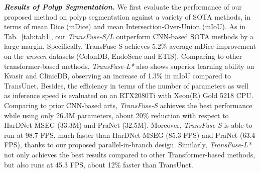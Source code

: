 \documentclass[runningheads]{llncs}
\begin{document}
\textit{\textbf{Results of Polyp Segmentation.}}
We first evaluate the performance of our proposed method on polyp segmentation against a variety of SOTA methods, in terms of mean Dice (mDice) and mean Intersection-Over-Union (mIoU). 
As in Tab.~\ref{tab:tab1}, our \textit{TransFuse-S/L} outperform CNN-based SOTA methods by a large margin. Specifically, TransFuse-S achieves 5.2\% average mDice improvement on the \textit{unseen} datasets (ColonDB, EndoSene and ETIS). Comparing to other transformer-based methods, \textit{TransFuse-L*} also shows superior learning ability on Kvasir and ClinicDB, observing an increase of 1.3\% in mIoU compared to TransUnet. 
Besides, the efficiency in terms of the number of parameters as well as inference speed is evaluated on an RTX2080Ti with Xeon(R) Gold 5218 CPU. Comparing to prior CNN-based arts, \textit{TransFuse-S} achieves the best performance while using only 26.3M parameters, about 20\% reduction with respect to HarDNet-MSEG (33.3M) and PraNet (32.5M). Moreover, \textit{TransFuse-S} is able to run at 98.7 FPS, much faster than HarDNet-MSEG (85.3 FPS) and PraNet (63.4 FPS), thanks to our proposed parallel-in-branch design. Similarly, \textit{TransFuse-L*} not only achieves the best results compared to other Transformer-based methods, but also runs at 45.3 FPS, about 12\% faster than TransUnet.
\end{document}
